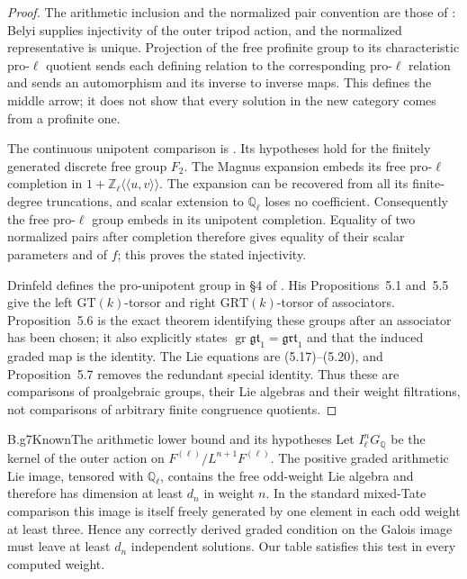 \begin{proof}
The arithmetic inclusion and the normalized pair convention are
those of \citet[Proposition~1, Proposition~2 and Main Theorem]{HS2000}:
Belyi supplies injectivity of the outer tripod action, and the
normalized representative is unique.  Projection of the free
profinite group to its characteristic pro-$\ell$ quotient sends each
defining relation to the corresponding pro-$\ell$ relation and sends
an automorphism and its inverse to inverse maps.  This defines the
middle arrow; it does not show that every solution in the new category
comes from a profinite one.

The continuous unipotent comparison is
\citet[Theorem~A.6 and Corollary~A.10]{HM2003}.
Its hypotheses hold for the finitely generated discrete free group
$F_2$.  The Magnus expansion embeds its free pro-$\ell$ completion
in $1+\mathbb Z_\ell\langle\!\langle u,v\rangle\!\rangle$.
The expansion can be recovered from all its finite-degree truncations,
and scalar extension to $\mathbb Q_\ell$ loses no coefficient.
Consequently the free pro-$\ell$ group embeds in its unipotent
completion.  Equality of two normalized pairs after completion
therefore gives equality of their scalar parameters and of $f$;
this proves the stated injectivity.

Drinfeld defines the pro-unipotent group in \S4 of
\citet{Drinfeld1990g}.  His Propositions~5.1 and~5.5 give the left
$\mathrm{GT}(k)$-torsor and right $\mathrm{GRT}(k)$-torsor of
associators.  Proposition~5.6 is the exact theorem identifying these
groups after an associator has been chosen; it also explicitly states
$\operatorname{gr}\mathfrak{gt}_1=\mathfrak{grt}_1$ and that the
induced graded map is the identity.  The Lie equations are
(5.17)--(5.20), and Proposition~5.7 removes the redundant special
identity.  Thus these are comparisons of proalgebraic groups, their
Lie algebras and their weight filtrations, not comparisons of arbitrary
finite congruence quotients.
\end{proof}

\begin{claim}{B.g7}{Known}{The arithmetic lower bound and its hypotheses}
Let $I^n_\ell G_{\mathbb Q}$ be the kernel of the outer action on
$F^{(\ell)}/L^{n+1}F^{(\ell)}$.  The positive graded arithmetic Lie
image, tensored with $\mathbb Q_\ell$, contains the free odd-weight
Lie algebra and therefore has dimension at least $d_n$ in weight $n$.
In the standard mixed-Tate comparison this image is itself freely
generated by one element in each odd weight at least three.  Hence
any correctly derived graded condition on the Galois image must leave
at least $d_n$ independent solutions.  Our table satisfies this test
in every computed weight.
\end{claim}

